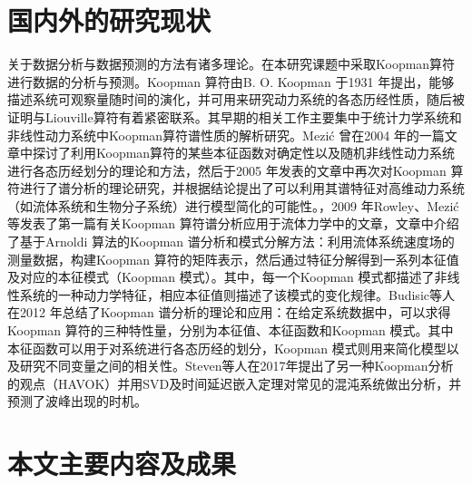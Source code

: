 \section{国内外的研究现状}
关于数据分析与数据预测的方法有诸多理论。在本研究课题中采取Koopman算符进行数据的分析与预测。Koopman 算符由B. O. Koopman 于1931 年提出，能够描述系统可观察量随时间的演化，并可用来研究动力系统的各态历经性质，随后被证明与Liouville算符有着紧密联系。其早期的相关工作主要集中于统计力学系统和非线性动力系统中Koopman算符谱性质的解析研究。Mezić 曾在2004 年的一篇文章中探讨了利用Koopman算符的某些本征函数对确定性以及随机非线性动力系统进行各态历经划分的理论和方法，然后于2005 年发表的文章中再次对Koopman 算符进行了谱分析的理论研究，并根据结论提出了可以利用其谱特征对高维动力系统（如流体系统和生物分子系统）进行模型简化的可能性。，2009 年Rowley、Mezić 等发表了第一篇有关Koopman 算符谱分析应用于流体力学中的文章，文章中介绍了基于Arnoldi 算法的Koopman 谱分析和模式分解方法：利用流体系统速度场的测量数据，构建Koopman 算符的矩阵表示，然后通过特征分解得到一系列本征值及对应的本征模式（Koopman 模式）。其中，每一个Koopman 模式都描述了非线性系统的一种动力学特征，相应本征值则描述了该模式的变化规律。Budisic等人在2012 年总结了Koopman 谱分析的理论和应用：在给定系统数据中，可以求得Koopman 算符的三种特性量，分别为本征值、本征函数和Koopman 模式。其中本征函数可以用于对系统进行各态历经的划分，Koopman 模式则用来简化模型以及研究不同变量之间的相关性。Steven等人在2017年提出了另一种Koopman分析的观点（HAVOK）并用SVD及时间延迟嵌入定理对常见的混沌系统做出分析，并预测了波峰出现的时机。

\section{本文主要内容及成果}





% 
% 

